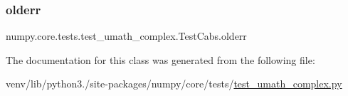 \subsubsection{\texorpdfstring{olderr}{olderr}}
{\footnotesize\ttfamily numpy.\+core.\+tests.\+test\+\_\+umath\+\_\+complex.\+Test\+Cabs.\+olderr}



The documentation for this class was generated from the following file\+:\begin{DoxyCompactItemize}
\item 
venv/lib/python3./site-\/packages/numpy/core/tests/\hyperlink{test__umath__complex_8py}{test\+\_\+umath\+\_\+complex.\+py}\end{DoxyCompactItemize}
